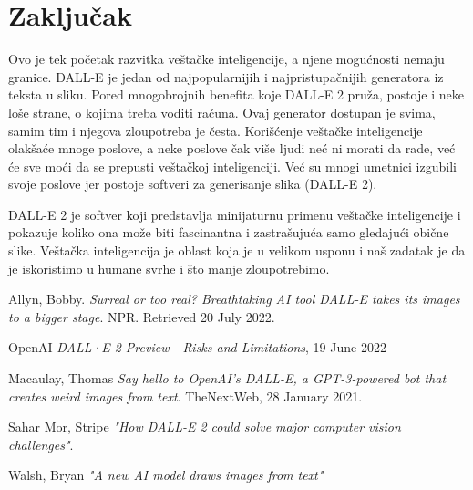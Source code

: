 \documentclass[a4paper]{article}
\begin{document}
\section{Zaključak}
Ovo je tek početak razvitka veštačke inteligencije, a njene mogućnosti nemaju granice. DALL-E je jedan od najpopularnijih i najpristupačnijih generatora iz teksta u sliku. Pored mnogobrojnih benefita koje DALL-E 2 pruža, postoje i neke loše strane, o kojima treba voditi računa. Ovaj generator dostupan je svima, samim tim i njegova zloupotreba je česta. Korišćenje veštačke inteligencije olakšaće mnoge poslove, a neke poslove čak više ljudi neć ni morati da rade, već će sve moći da se prepusti veštačkoj inteligenciji. Već su mnogi umetnici izgubili svoje poslove jer postoje softveri za generisanje slika (DALL-E 2). 

DALL-E 2 je softver koji predstavlja minijaturnu primenu veštačke inteligencije i pokazuje koliko ona može biti fascinantna i zastrašujuća samo gledajući obične slike. Veštačka inteligencija je oblast koja je u velikom usponu i naš zadatak je da je iskoristimo u humane svrhe i što manje zloupotrebimo.



\appendix

\begin{thebibliography}{9}

 Allyn, Bobby. \emph{ Surreal or too real? Breathtaking AI tool DALL-E takes its images to a bigger stage}. NPR. Retrieved 20 July 2022.

  OpenAI \emph{  DALL·E 2 Preview - Risks and Limitations}, 19 June 2022 

  Macaulay, Thomas \emph{ Say hello to OpenAI's DALL-E, a GPT-3-powered bot that creates weird images from text}. TheNextWeb, 28 January 2021.

 Sahar Mor, Stripe \emph {"How DALL-E 2 could solve major computer vision challenges"}.

 Walsh, Bryan \emph{ "A new AI model draws images from text"}


\end{thebibliography}



\appendix
\end{document}

